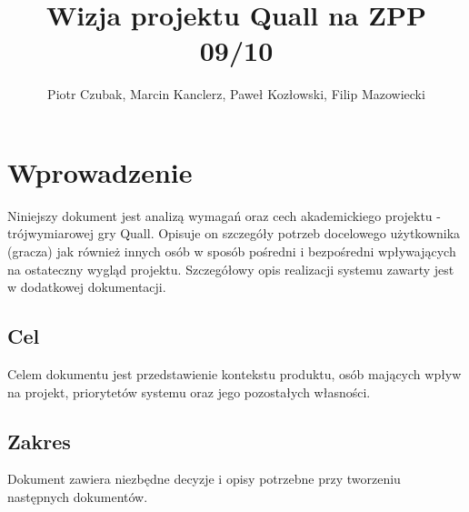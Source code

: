 \documentclass[12pt,a4paper,twoside]{article}
\author{Piotr Czubak, Marcin Kanclerz, Paweł Kozłowski, Filip Mazowiecki}
\title{Wizja projektu Quall na ZPP 09/10}
\begin{document}
\maketitle

\newpage

\tableofcontents

\newpage


%   


\section{Wprowadzenie}
Niniejszy dokument jest analizą wymagań oraz cech akademickiego projektu - trójwymiarowej gry Quall. 
Opisuje on szczegóły potrzeb docelowego użytkownika (gracza) jak również innych osób w sposób pośredni i bezpośredni wpływających na ostateczny wygląd projektu.
Szczegółowy opis realizacji systemu zawarty jest w dodatkowej dokumentacji.



\subsection{Cel}
Celem dokumentu jest przedstawienie kontekstu produktu, osób mających wpływ na projekt, priorytetów systemu oraz jego pozostałych własności.


\subsection{Zakres}
Dokument zawiera niezbędne decyzje i opisy potrzebne przy tworzeniu następnych dokumentów.
\end{document}

